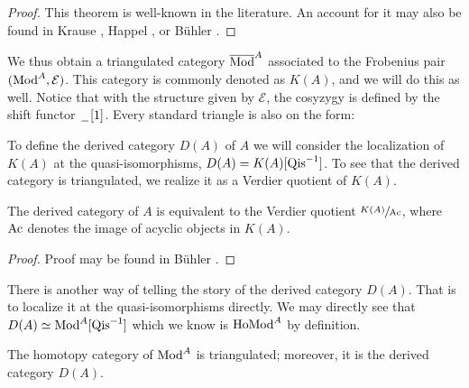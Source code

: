 \documentclass[../thesis.tex]{subfiles}
\begin{document}
            \begin{proof}
                This theorem is well-known in the literature. An account for it may also be found in Krause \cite{Krause21}, Happel \cite{Happel88}, or B\"uhler \cite{Buhler10}.
            \end{proof}

            We thus obtain a triangulated category $\overline{\tt{Mod}}^A$ associated to the Frobenius pair $(\tt{Mod}^A, \mathcal{E})$. This category is commonly denoted as $K(A)$, and we will do this as well. Notice that with the structure given by $\mathcal{E}$, the cosyzygy is defined by the shift functor $\argument [1]$. Every standard triangle is also on the form:

            \begin{center}
            \end{center}

            To define the derived category $D(A)$ of $A$ we will consider the localization of $K(A)$ at the quasi-isomorphisms, $D(A) = K(A)[\tt{Qis}^{-1}]$. To see that the derived category is triangulated, we realize it as a Verdier quotient of $K(A)$.

            \begin{proposition}
                The derived category of $A$ is equivalent to the Verdier quotient $\sfrac{K(A)}{\tt{Ac}}$, where $\tt{Ac}$ denotes the image of acyclic objects in $K(A)$.
            \end{proposition}

            \begin{proof}
                Proof may be found in B\"uhler \cite{Buhler10}.
            \end{proof}

            There is another way of telling the story of the derived category $D(A)$. That is to localize it at the quasi-isomorphisms directly. We may directly see that $D(A) \simeq \tt{Mod}^A[\tt{Qis}^{-1}]$ which we know is $\tt{Ho} \tt{Mod}^A$ by definition.

            \begin{thm}
                The homotopy category of $\tt{Mod}^A$ is triangulated; moreover, it is the derived category $D(A)$.
            \end{thm}
\end{document}
